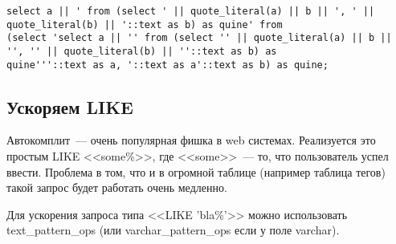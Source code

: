 \begin{lstlisting}[label=lst:snippets13,title=snippets/quine.sql]
select a || ' from (select ' || quote_literal(a) || b || ', ' || quote_literal(b) || '::text as b) as quine' from
(select 'select a || '' from (select '' || quote_literal(a) || b || '', '' || quote_literal(b) || ''::text as b) as
quine'''::text as a, '::text as a'::text as b) as quine;
\end{lstlisting}

\subsection{Ускоряем LIKE}
Автокомплит~--- очень популярная фишка в web системах. Реализуется это простым LIKE <<some\%>>,
где <<some>>~--- то, что пользователь успел ввести. Проблема в том, что и в огромной таблице
(например таблица тегов) такой запрос будет работать очень медленно.

Для ускорения запроса типа <<LIKE 'bla\%'>> можно использовать text\_pattern\_ops
(или varchar\_pattern\_ops если у поле varchar).

